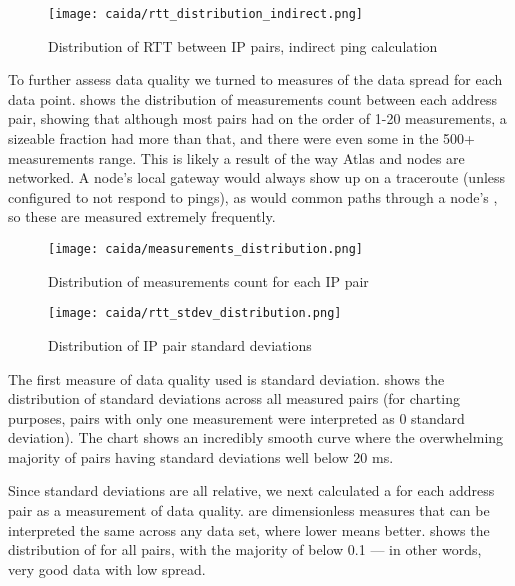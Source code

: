 \begin{figure}[h]
    \centering
    \texttt{[image: caida/rtt\_distribution\_indirect.png]}
    \caption{Distribution of RTT between IP pairs, indirect ping calculation}
    \label{fig:caida_rtt_distribution_indirect}
\end{figure}

To further assess data quality we turned to measures of the data spread for each data point.  shows the distribution of measurements count between each \ip address pair, showing that although most pairs had on the order of 1-20 measurements, a sizeable fraction had more than that, and there were even some in the 500+ measurements range. This is likely a result of the way \ripe Atlas and \caida nodes are networked. A node's local gateway would always show up on a traceroute (unless configured to not respond to pings), as would common paths through a node's \isp, so these \ips are measured extremely frequently.

\begin{figure}[h]
    \centering
    \texttt{[image: caida/measurements\_distribution.png]}
    \caption{Distribution of measurements count for each IP pair}
    \label{fig:caida_measurements_distribution}
\end{figure}

\begin{figure}[h]
    \centering
    \texttt{[image: caida/rtt\_stdev\_distribution.png]}
    \caption{Distribution of IP pair standard deviations}
    \label{fig:caida_stdev_distribution}
\end{figure}

The first measure of data quality used is standard deviation.  shows the distribution of standard deviations across all measured \ip pairs (for charting purposes, pairs with only one measurement were interpreted as 0 standard deviation). The chart shows an incredibly smooth curve where the overwhelming majority of pairs having standard deviations well below 20 ms.

Since standard deviations are all relative, we next calculated a \cv for each \ip address pair as a measurement of data quality. \CVs are dimensionless measures that can be interpreted the same across any data set, where lower means better.  shows the distribution of \cvs for all \ip pairs, with the majority of \cvs below 0.1 --- in other words, very good data with low spread.

